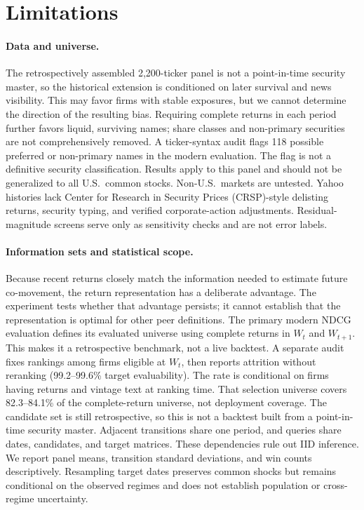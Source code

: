 \documentclass[sigconf,anonymous]{acmart}
\begin{document}
\section{Limitations}
\label{sec:limitations}

\paragraph{Data and universe.}
The retrospectively assembled 2{,}200-ticker panel is not a point-in-time
security master, so the historical extension is conditioned on later survival
and news visibility.  This may favor firms with stable exposures, but we cannot
determine the direction of the resulting bias.
Requiring complete returns in each period further favors liquid, surviving names; share classes
and non-primary securities are not comprehensively removed.  A ticker-syntax
audit flags 118 possible preferred or non-primary names in the modern
evaluation.  The flag is not a definitive security classification.  Results
apply to this panel and should not be generalized to all U.S.\ common stocks.
Non-U.S.\ markets are untested.  Yahoo histories lack Center for Research in Security Prices
(CRSP)-style delisting returns, security
typing, and verified corporate-action adjustments.  Residual-magnitude screens
serve only as sensitivity checks and are not error labels.

\paragraph{Information sets and statistical scope.}
Because recent returns closely match the information needed to estimate future
co-movement, the return representation has a deliberate advantage.  The
experiment tests whether that advantage persists; it cannot establish that the representation
is optimal for other peer definitions.  The primary modern NDCG evaluation defines
its evaluated universe using complete returns in $W_t$ and $W_{t+1}$.  This
makes it a retrospective benchmark, not a live backtest.  A separate audit
fixes rankings among firms eligible at $W_t$, then reports attrition without reranking
(99.2--99.6\% target evaluability).  The rate is conditional on firms having
returns and vintage text at ranking time.  That selection universe
covers 82.3--84.1\% of the complete-return universe, not deployment coverage.
The candidate set is still retrospective, so this is not a backtest built from
a point-in-time security master.
Adjacent transitions share one period, and queries share dates, candidates, and
target matrices.  These dependencies rule out IID inference.  We report panel
means, transition standard deviations, and win counts descriptively.  Resampling target dates preserves
common shocks but remains conditional on the observed regimes and does not
establish population or cross-regime uncertainty.
\end{document}
